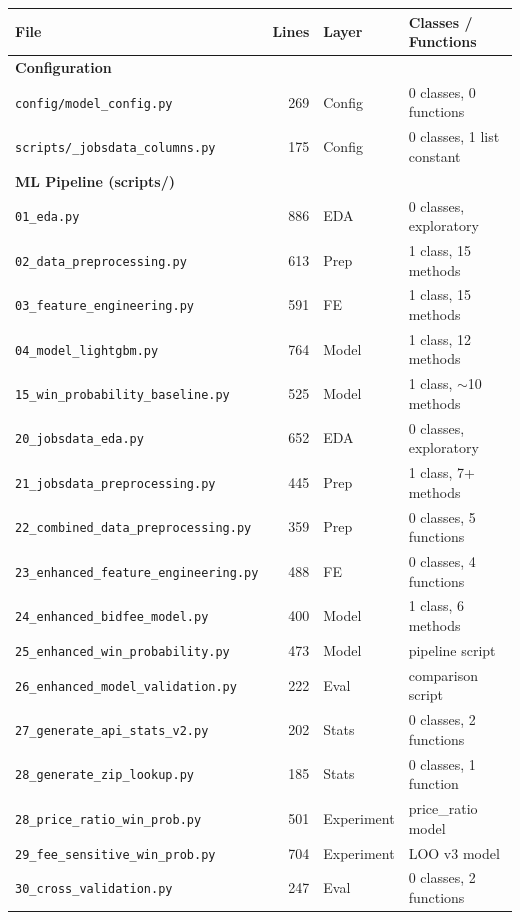 \documentclass[11pt,a4paper]{article}
\newcommand{\file}[1]{\texttt{\color{gssblue!70!black}#1}}
\begin{document}
\begin{longtable}{l r l l}
\toprule
\textbf{File} & \textbf{Lines} & \textbf{Layer} & \textbf{Classes / Functions} \\
\midrule
\endhead
\multicolumn{4}{l}{\textbf{\color{configorange}Configuration}} \\
\file{config/model\_config.py} & 269 & Config & 0 classes, 0 functions \\
\file{scripts/\_jobsdata\_columns.py} & 175 & Config & 0 classes, 1 list constant \\
\midrule
\multicolumn{4}{l}{\textbf{\color{pipeblue}ML Pipeline (scripts/)}} \\
\file{01\_eda.py} & 886 & EDA & 0 classes, exploratory \\
\file{02\_data\_preprocessing.py} & 613 & Prep & 1 class, 15 methods \\
\file{03\_feature\_engineering.py} & 591 & FE & 1 class, 15 methods \\
\file{04\_model\_lightgbm.py} & 764 & Model & 1 class, 12 methods \\
\file{15\_win\_probability\_baseline.py} & 525 & Model & 1 class, $\sim$10 methods \\
\file{20\_jobsdata\_eda.py} & 652 & EDA & 0 classes, exploratory \\
\file{21\_jobsdata\_preprocessing.py} & 445 & Prep & 1 class, 7+ methods \\
\file{22\_combined\_data\_preprocessing.py} & 359 & Prep & 0 classes, 5 functions \\
\file{23\_enhanced\_feature\_engineering.py} & 488 & FE & 0 classes, 4 functions \\
\file{24\_enhanced\_bidfee\_model.py} & 400 & Model & 1 class, 6 methods \\
\file{25\_enhanced\_win\_probability.py} & 473 & Model & pipeline script \\
\file{26\_enhanced\_model\_validation.py} & 222 & Eval & comparison script \\
\file{27\_generate\_api\_stats\_v2.py} & 202 & Stats & 0 classes, 2 functions \\
\file{28\_generate\_zip\_lookup.py} & 185 & Stats & 0 classes, 1 function \\
\file{28\_price\_ratio\_win\_prob.py} & 501 & Experiment & price\_ratio model \\
\file{29\_fee\_sensitive\_win\_prob.py} & 704 & Experiment & LOO v3 model \\
\file{30\_cross\_validation.py} & 247 & Eval & 0 classes, 2 functions \\

\end{longtable}
\end{document}
